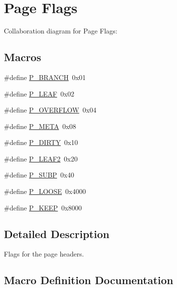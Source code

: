 \hypertarget{group__mdb__page}{}\section{Page Flags}
\label{group__mdb__page}
Collaboration diagram for Page Flags\+:
\subsection*{Macros}
\begin{DoxyCompactItemize}
\item 
\#define \mbox{\hyperlink{group__mdb__page_gad6639bfcad26dbcbf7970dfa28f1a930}{P\+\_\+\+B\+R\+A\+N\+CH}}~0x01
\item 
\#define \mbox{\hyperlink{group__mdb__page_gac85fb59a9a2eda0d33e58b23a7ca019a}{P\+\_\+\+L\+E\+AF}}~0x02
\item 
\#define \mbox{\hyperlink{group__mdb__page_ga15141fe5d59efdf035bf8862250c25d7}{P\+\_\+\+O\+V\+E\+R\+F\+L\+OW}}~0x04
\item 
\#define \mbox{\hyperlink{group__mdb__page_ga3d5d5c4af2527d4d9230d414230580ac}{P\+\_\+\+M\+E\+TA}}~0x08
\item 
\#define \mbox{\hyperlink{group__mdb__page_ga80db76242076099b1bbaba0ddec794fb}{P\+\_\+\+D\+I\+R\+TY}}~0x10
\item 
\#define \mbox{\hyperlink{group__mdb__page_ga9c80486a549b2efbd5561cdd4df238c4}{P\+\_\+\+L\+E\+A\+F2}}~0x20
\item 
\#define \mbox{\hyperlink{group__mdb__page_ga77cc6dc98fda40c81fb2f75068fb5551}{P\+\_\+\+S\+U\+BP}}~0x40
\item 
\#define \mbox{\hyperlink{group__mdb__page_ga73ff31a5404097c8220ef956a0ddbb80}{P\+\_\+\+L\+O\+O\+SE}}~0x4000
\item 
\#define \mbox{\hyperlink{group__mdb__page_ga1d56f6cd16428f86d1f558668ade8487}{P\+\_\+\+K\+E\+EP}}~0x8000
\end{DoxyCompactItemize}


\subsection{Detailed Description}
Flags for the page headers. 

\subsection{Macro Definition Documentation}
\mbox{\label{group__mdb__page_gad6639bfcad26dbcbf7970dfa28f1a930}} 
